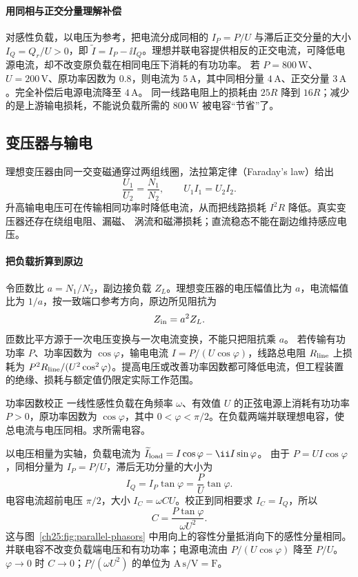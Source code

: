 \paragraph{用同相与正交分量理解补偿}
对感性负载，以电压为参考，把电流分成同相的 $I_P=P/U$ 与滞后正交分量的大小 $I_Q=Q_r/U>0$，即 $\widetilde I=I_P-\ii I_Q$。理想并联电容提供相反的正交电流，可降低电源电流，却不改变原负载在相同电压下消耗的有功功率。
若 $P=800\,\mathrm W$、$U=200\,\mathrm V$、原功率因数为 $0.8$，则电流为 $5\,\mathrm A$，其中同相分量 $4\,\mathrm A$、正交分量 $3\,\mathrm A$。完全补偿后电源电流降至 $4\,\mathrm A$。
同一线路电阻上的损耗由 $25R$ 降到 $16R$；减少的是上游输电损耗，不能说负载所需的 $800\,\mathrm W$ 被电容“节省”了。


\subsection{变压器与输电}


理想变压器由同一交变磁通穿过两组线圈，法拉第定律（Faraday's law）给出
\begin{equation}
 \frac{U_1}{U_2}=\frac{N_1}{N_2},
 \qquad U_1I_1=U_2I_2.
\end{equation}
升高输电电压可在传输相同功率时降低电流，从而把线路损耗 $I^2R$ 降低。真实变压器还存在绕组电阻、漏磁、
涡流和磁滞损耗；直流稳态不能在副边维持感应电压。


\paragraph{把负载折算到原边}
令匝数比 $a=N_1/N_2$，副边接负载 $Z_L$。理想变压器的电压幅值比为 $a$，电流幅值比为 $1/a$，按一致端口参考方向，原边所见阻抗为
\[
 Z_{\rm in}=a^2 Z_L.
\]
匝数比平方源于一次电压变换与一次电流变换，不能只把阻抗乘 $a$。
若传输有功功率 $P$、功率因数为 $\cos\varphi$，输电电流 $I=P/(U\cos\varphi)$，线路总电阻 $R_{\rm line}$ 上损耗为
$P^2R_{\rm line}/(U^2\cos^2\varphi)$。提高电压或改善功率因数都可降低电流，但工程装置的绝缘、损耗与额定值仍限定实际工作范围。

\begin{origexamplebox}{功率因数校正}
一线性感性负载在角频率 $\omega$、有效值 $U$ 的正弦电源上消耗有功功率 $P>0$，原功率因数为 $\cos\varphi$，其中 $0<\varphi<\pi/2$。在负载两端并联理想电容，使总电流与电压同相。求所需电容。
\end{origexamplebox}
\begin{xesolution}
以电压相量为实轴，负载电流为 $\widetilde I_{\rm load}=I\cos\varphi-\ii I\sin\varphi$。
由于 $P=UI\cos\varphi$，同相分量为 $I_P=P/U$，滞后无功分量的大小为
\[
 I_Q=I_P\tan\varphi=\frac PU\tan\varphi.
\]
电容电流超前电压 $\pi/2$，大小 $I_C=\omega CU$。校正到同相要求 $I_C=I_Q$，所以
\[
 \boxed{C=\frac{P\tan\varphi}{\omega U^2}}.
\]
这与图~\ref{ch25:fig:parallel-phasors} 中用向上的容性分量抵消向下的感性分量相同。
并联电容不改变负载端电压和有功功率；电源电流由 $P/(U\cos\varphi)$ 降至 $P/U$。
$\varphi\to0$ 时 $C\to0$；$P/(\omega U^2)$ 的单位为 $\mathrm{A\,s/V=F}$。
\end{xesolution}


